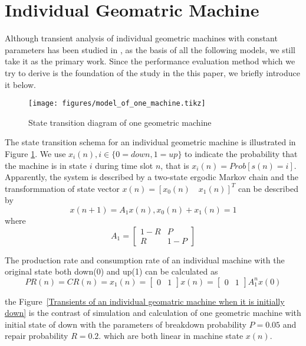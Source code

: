 \section{Individual Geomatric Machine}
\noindent Although transient analysis of individual geometric machines with constant parameters has been studied in \cite{meerkov2010transient}, as the basis of all the following models, we still take it as the primary work. Since the performance evaluation method which we try to derive is the foundation of the study in the this paper, we briefly introduce it below.
\begin{figure}[!h]
	\centering
	\texttt{[image: figures/model\_of\_one\_machine.tikz]}
	\caption{State transition diagram of one geometric machine}
	\label{State transition diagram of one geometric machine}
\end{figure}


The state transition schema for an individual geometric machine is illustrated in Figure \ref{State transition diagram of one geometric machine}. We use $x_i(n), i \in \{0=down,1=up\}$ to indicate the probability that the machine is in state $i$ during time slot $n$, that is $x_i(n)=Prob[s(n)=i]$. Apparently, the system is described by a two-state ergodic Markov chain and the transformmation of state vector $x(n)=[x_0(n) \quad x_1(n)]^T$ can be described by
\begin{equation}
	x(n+1) = A_1x(n), x_0(n) + x_1(n) =1
\end{equation}
where
\begin{equation} A_1 = \begin{bmatrix} 1-R&P\\R&1-P \end{bmatrix} \end{equation}

The production rate and consumption rate of an individual machine with the original state both down(0) and up(1) can be calculated as 
\begin{equation} PR(n)=CR(n)=x_1(n)=\begin{bmatrix} 0&1 \end{bmatrix}x(n)=\begin{bmatrix} 0&1 \end{bmatrix}A_1^n
x(0) \end{equation}

the Figure~\ref{Transients of an individual geomatric machine when it is initially down} is the contrast of simulation and calculation of one geometric machine with initial state of down with the parameters of breakdown
probability $P = 0.05$ and repair probability $R = 0.2$.
which are both linear in machine state $x(n)$.


